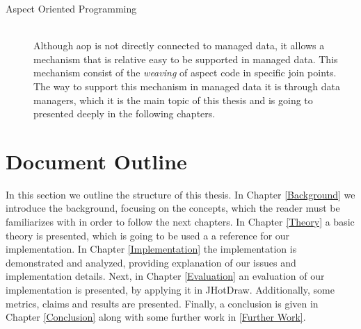 \begin{description}
  \item[Aspect Oriented Programming]~\\
  Although \ac{aop} is not directly connected to managed data, it allows a mechanism that is relative easy to be supported in managed data.
  This mechanism consist of the \textit{weaving} of aspect code in specific join points. 
  The way to support this mechanism in managed data it is through data managers, which it is the main topic of this thesis and 
  is going to presented deeply in the following chapters.

\end{description}

\section{Document Outline}\label{Document Outline}
In this section we outline the structure of this thesis. 
In Chapter \ref{Background} we introduce the background, focusing on the concepts, which the reader must be familiarizes with 
in order to follow the next chapters.
In Chapter \ref{Theory} a basic theory is presented, which is going to be used a a reference for our implementation.
In Chapter \ref{Implementation} the implementation is demonstrated and analyzed, providing explanation of our issues 
and implementation details.
Next, in Chapter \ref{Evaluation} an evaluation of our implementation is presented, by applying it in JHotDraw. 
Additionally, some metrics, claims and results are presented.
Finally, a conclusion is given in Chapter \ref{Conclusion} along with some further work in \ref{Further Work}.


